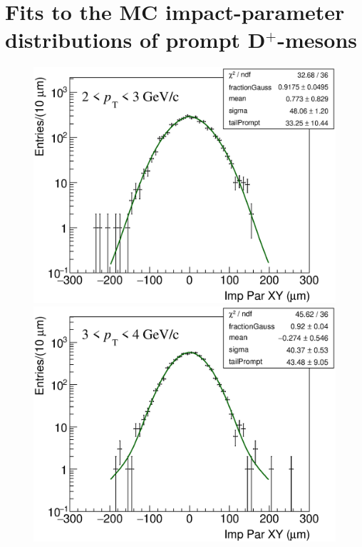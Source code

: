 \documentclass[b5paper,10pt,twoside,oldstyle,classica]{toptesi}
\begin{document}
\section{Fits to the MC impact-parameter distributions of prompt D$^+$-mesons}
\label{prompt_prefit_appendix}
\begin{figure}[h]
\begin{center}
\vspace{-0.5cm}
{\includegraphics[scale = 0.24]{ImpParPrompt_2-3.eps}}
\hspace{0cm}
{\includegraphics[scale = 0.24]{ImpParPrompt_3-4.eps}}
\vspace{0cm}

\end{center}
\end{figure}
\end{document}
